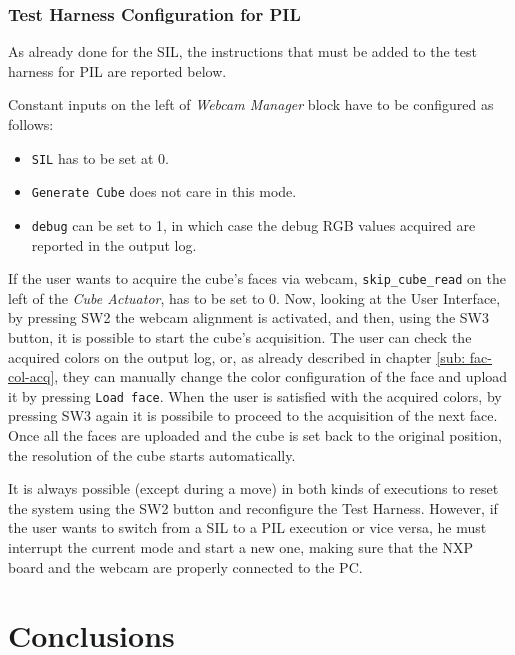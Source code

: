 \documentclass{report}
\begin{document}
\subsection{Test Harness Configuration for PIL}
As already done for the SIL, the instructions that must be added to the test harness for PIL are reported below.

Constant inputs on the left of \textit{Webcam Manager} block have to be configured as follows:
\begin{itemize}
    \item \texttt{SIL} has to be set at 0.
    \item \texttt{Generate Cube} does not care in this mode.
    \item \texttt{debug} can be set to 1, in which case the debug RGB values acquired are reported in the output log.
\end{itemize}
\medskip
If the user wants to acquire the cube's faces via webcam, \texttt{skip\_cube\_read} on the left of the \textit{Cube Actuator}, has to be set to 0. Now, looking at the User Interface, by pressing SW2 the webcam alignment is activated, and then, using the SW3 button, it is possible to start the cube's acquisition. The user can check the acquired colors on the output log, or, as already described in chapter \ref{sub: fac-col-acq}, they can manually change the color configuration of the face and upload it by pressing \texttt{Load face}. When the user is satisfied with the acquired colors, by pressing SW3 again it is possibile to proceed to the acquisition of the next face. Once all the faces are uploaded and the cube is set back to the original position, the resolution of the cube starts automatically.

\bigskip

It is always possible (except during a move) in both kinds of executions to reset the system using the SW2 button and reconfigure the Test Harness. However, if the user wants to switch from a SIL to a PIL execution or vice versa, he must interrupt the current mode and start a new one, making sure that the NXP board and the webcam are properly connected to the PC.


\chapter{Conclusions}
\end{document}
